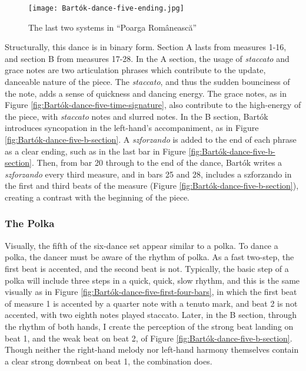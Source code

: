 \begin{figure}
  \centering
  \texttt{[image: Bartók-dance-five-ending.jpg]}
  \caption[The last two systems in ``Poarga Românească'' of Bartók's \textit{Romanian Folk Dances, Sz. 56, BB 68}]{The last two systems in ``Poarga Românească''}
  \label{fig:Bartók-dance-five-ending}
\end{figure}


Structurally, this dance is in binary form. Section A lasts from measures 1-16, and section B from measures 17-28. In the A section, the usage of \textit{staccato} and grace notes are two articulation phrases which contribute to the update, danceable nature of the piece. The \textit{staccato}, and thus the sudden bounciness of the note, adds a sense of quickness and dancing energy. The grace notes, as in Figure \ref{fig:Bartók-dance-five-time-signature}\autocite{Lung_2016}, also contribute to the high-energy of the piece, with \textit{staccato} notes and slurred notes. In the B section, Bartók introduces syncopation in the left-hand's accompaniment, as in Figure \ref{fig:Bartók-dance-five-b-section}\autocite{Lung_2016}. A \textit{szforzando} is added to the end of each phrase as a clear ending, such as in the last bar in Figure \ref{fig:Bartók-dance-five-b-section}\autocite{Lung_2016}. Then, from bar 20 through to the end of the dance, Bartók writes a \textit{szforzando} every third measure, and in bars 25 and 28, includes a szforzando in the first and third beats of the measure (Figure \ref{fig:Bartók-dance-five-b-section}\autocite{Lung_2016}), creating a contrast with the beginning of the piece. 

\subsubsection{The Polka}

Visually, the fifth of the six-dance set appear similar to a polka. To dance a polka, the dancer must be aware of the rhythm of polka. As a fast two-step, the first beat is accented, and the second beat is not. Typically, the basic step of a polka will include three steps in a quick, quick, slow rhythm, and this is the same visually as in Figure \ref{fig:Bartók-dance-five-first-four-bars}\autocite{Lung_2016}, in which the first beat of measure 1 is accented by a quarter note with a tenuto mark, and beat 2 is not accented, with two eighth notes played staccato. Later, in the B section, through the rhythm of both hands, I create the perception of the strong beat landing on beat 1, and the weak beat on beat 2, of Figure \ref{fig:Bartók-dance-five-b-section}\autocite{Lung_2016}. Though neither the right-hand melody nor left-hand harmony themselves contain a clear strong downbeat on beat 1, the combination does. 

